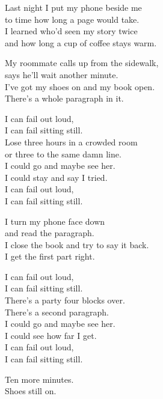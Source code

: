 \begin{lyrics}
Last night I put my phone beside me\\
to time how long a page would take.\\
I learned who’d seen my story twice\\
and how long a cup of coffee stays warm.

My roommate calls up from the sidewalk,\\
says he’ll wait another minute.\\
I’ve got my shoes on and my book open.\\
There’s a whole paragraph in it.

I can fail out loud,\\
I can fail sitting still.\\
Lose three hours in a crowded room\\
or three to the same damn line.\\
I could go and maybe see her.\\
I could stay and say I tried.\\
I can fail out loud,\\
I can fail sitting still.

I turn my phone face down\\
and read the paragraph.\\
I close the book and try to say it back.\\
I get the first part right.

I can fail out loud,\\
I can fail sitting still.\\
There’s a party four blocks over.\\
There’s a second paragraph.\\
I could go and maybe see her.\\
I could see how far I get.\\
I can fail out loud,\\
I can fail sitting still.

Ten more minutes.\\
Shoes still on.
\end{lyrics}

